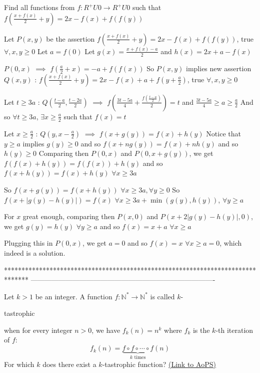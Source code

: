 \begin{solution}
	\begin{tcolorbox}Find all functions from $f: R^{+}U{{0}}\rightarrow R^{+}U{{0}}$ such that $f(\frac{x+f(x)}{2}+y)=2x-f(x)+f(f(y))$\end{tcolorbox}
Let $P(x,y)$ be the assertion $f(\frac{x+f(x)}2+y)=2x-f(x)+f(f(y))$, true $\forall, x,y\ge 0$
Let $a=f(0)$
Let $g(x)=\frac{x+f(x)-a}2$ and $h(x)=2x+a-f(x)$

$P(0,x)$ $\implies$ $f(\frac a2+x)=-a+f(f(x))$
So $P(x,y)$ implies new assertion $Q(x,y)$ : $f(\frac{x+f(x)}2+y)=2x-f(x)+a+f(y+\frac a2)$, true $\forall, x,y\ge 0$

Let $t\ge 3a$ : $Q(\frac{t-a}2,\frac{t-2a}2)$ $\implies$  $f(\frac{3t-5a}4+\frac{f(\frac{t-a}2)}2)=t$ and $\frac{3t-5a}4\ge a\ge\frac a2$
And so $\forall t\ge 3a$, $\exists x\ge \frac a2$ such that $f(x)=t$

Let $x\ge \frac a2$ : 
$Q(y,x-\frac a2)$ $\implies$ $f(x+g(y))=f(x)+h(y)$
Notice that $y\ge a$ implies $g(y)\ge 0$ and so $f(x+ng(y))=f(x)+nh(y)$ and so $h(y)\ge 0$
Comparing then $P(0,x)$ and $P(0,x+g(y))$, we get $f(f(x)+h(y))=f(f(x))+h(y)$ and so $f(x+h(y))=f(x)+h(y)$ $\forall x\ge 3a$

So $f(x+g(y))=f(x+h(y))$ $\forall x\ge 3a,\forall y\ge 0$
So $f(x+|g(y)-h(y)|)=f(x)$ $\forall x\ge 3a+\min(g(y),h(y))$, $\forall y\ge a$

For $x$ great enough, comparing then $P(x,0)$ and $P(x+2|g(y)-h(y)|,0)$, we get $g(y)=h(y)$ $\forall y\ge a$ and so $f(x)=x+a$ $\forall x\ge a$

Plugging this in $P(0,x)$, we get $a=0$ and so $\boxed{f(x)=x}$ $\forall x\ge a=0$, which indeed is a solution.
\end{solution}
*******************************************************************************
-------------------------------------------------------------------------------

\begin{problem}
	Let $k>1$ be an integer. A function $f:\mathbb{N^*}\to\mathbb{N^*}$ is called $k$-\begin{italicized}tastrophic\end{italicized} when for every integer $n>0$, we have $f_k(n)=n^k$ where $f_k$ is the $k$-th iteration of $f$:
\[f_k(n)=\underbrace{f\circ f\circ\cdots \circ f}_{k\text{ times}}(n)\]
For which $k$ does there exist a $k$-tastrophic function?
	\flushright \href{https://artofproblemsolving.com/community/c6h491800}{(Link to AoPS)}
\end{problem}



